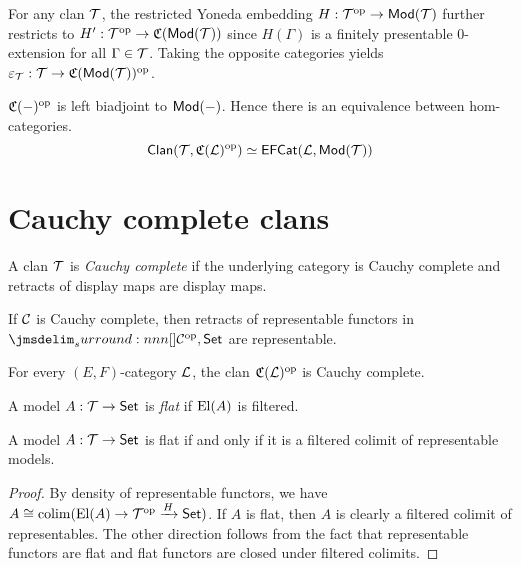 \documentclass[a4paper]{article}
\begin{document}
\begin{construction}
  For any clan $\mathcal{T}$, the restricted Yoneda embedding $H : \mathcal{T}^{\mathrm{op}} \to \mathsf{Mod}(\mathcal{T})$ further restricts to $H' : \mathcal{T}^{\mathrm{op}} \to \mathfrak{C}(\mathsf{Mod}(\mathcal{T}))$ since $H(\Gamma)$ is a finitely presentable 0-extension for all $\Gamma \in \mathcal{T}$.
  Taking the opposite categories yields $\varepsilon_{\mathcal{T}} : \mathcal{T} \to \mathfrak{C}(\mathsf{Mod}(\mathcal{T}))^{\mathrm{op}}$.
\end{construction}

\begin{theorem}
  $\mathfrak{C}(-)^{\mathrm{op}}$ is left biadjoint to $\mathsf{Mod}(-)$.
  Hence there is an equivalence between hom-categories.
  \[
    \mathsf{Clan}(\mathcal{T},\mathfrak{C}(\mathcal{L})^{\mathrm{op}}) \simeq \mathsf{EFCat}(\mathcal{L},\mathsf{Mod}(\mathcal{T}))
  \]
\end{theorem}

\section{Cauchy complete clans}

\begin{definition}
  A clan $\mathcal{T}$ is \emph{Cauchy complete} if the underlying category is Cauchy complete and retracts of display maps are display maps.
\end{definition}

\begin{remark}
  If $\mathcal{C}$ is Cauchy complete, then retracts of representable functors in $\funCat{\cC\op}{\Set}$ are representable.
\end{remark}

\begin{remark}
  For every $(E,F)$-category $\mathcal{L}$, the clan $\mathfrak{C}(\mathcal{L})^{\mathrm{op}}$ is Cauchy complete.
\end{remark}

\begin{definition}
  A model $A : \mathcal{T} \to \mathsf{Set}$ is \emph{flat} if $\operatorname{El}(A)$ is filtered.
\end{definition}

\begin{lemma}
  A model $A : \mathcal{T} \to \mathsf{Set}$ is flat if and only if it is a filtered colimit of representable models.
\end{lemma}
\begin{proof}
  By density of representable functors, we have $A \cong \operatorname{colim}(\operatorname{El}(A) \to \mathcal{T}^{\mathrm{op}} \xrightarrow{H} \mathsf{Set})$.
  If $A$ is flat, then $A$ is clearly a filtered colimit of representables.
  The other direction follows from the fact that representable functors are flat and flat functors are closed under filtered colimits.
\end{proof}
\end{document}

